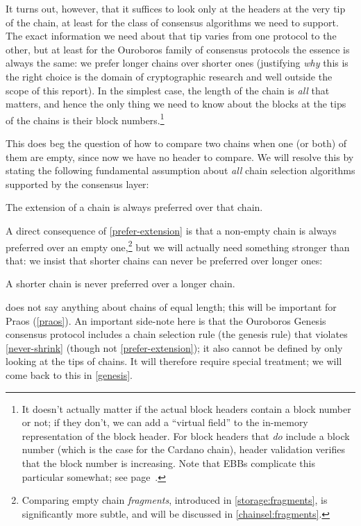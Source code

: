 It turns out, however, that it suffices to look only at the headers at the very
tip of the chain, at least for the class of consensus algorithms we need to
support. The exact information we need about that tip varies from
one protocol to the other, but at least for the Ouroboros family of consensus
protocols the essence is always the same: we prefer longer chains over shorter
ones (justifying \emph{why} this is the right choice is the domain  of
cryptographic research and well outside the scope of this report). In the
simplest case, the length of the chain is \emph{all} that matters, and hence the
only thing we need to know about the blocks at the tips of the chains is their
block numbers.\footnote{It doesn't actually matter if the actual block headers
contain a block number or not; if they don't, we can add a ``virtual field''
to the in-memory representation of the block header. For block headers that
\emph{do} include a block number (which is the case for the Cardano chain),
header  validation verifies that the block number is increasing. Note that EBBs
complicate this particular somewhat; see page~\pageref{ebb-chain-selection}.}

This does beg the question of how to compare two chains when one (or both) of
them are empty, since now we have no header to compare. We will resolve this by
stating the following fundamental assumption about \emph{all} chain selection
algorithms supported by the consensus layer:

\begin{assumption}
\label{prefer-extension}
The extension of a chain is always preferred over that chain.
\end{assumption}

A direct consequence of \cref{prefer-extension} is that a non-empty chain is
always preferred over an empty one,\footnote{Comparing empty chain
\emph{fragments}, introduced in \cref{storage:fragments}, is significantly more
subtle, and will be discussed in \cref{chainsel:fragments}.} but we will
actually need something stronger than that: we insist that shorter chains can
never be preferred over longer ones:

\begin{assumption}
\label{never-shrink}
A shorter chain is never preferred over a longer chain.
\end{assumption}

 does not say anything about chains of equal length; this will
be important for Praos (\cref{praos}). An important side-note here is that
the Ouroboros Genesis consensus protocol includes a chain selection rule
(the genesis rule) that violates \cref{never-shrink} (though not \cref{prefer-extension}); it also cannot be defined by only looking at the tips of chains.
It will therefore require special treatment; we will come back to this in
\cref{genesis}.


